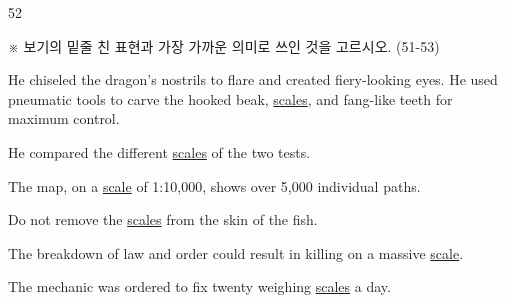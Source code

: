 \begin{question}{52}
\begin{framedtext}
※ 보기의 밑줄 친 표현과 가장 가까운 의미로 쓰인 것을 고르시오. (51-53) \par
\end{framedtext}
He chiseled the dragon's nostrils to flare and created fiery-looking eyes. He used pneumatic tools to carve the hooked beak, \uline{scales}, and fang-like teeth for maximum control.
\begin{choices}
  \item He compared the different \uline{scales} of the two tests.
  \item The map, on a \uline{scale} of 1:10,000, shows over 5,000 individual paths.
  \item Do not remove the \uline{scales} from the skin of the fish.
  \item The breakdown of law and order could result in killing on a massive \uline{scale}.
  \item The mechanic was ordered to fix twenty weighing \uline{scales} a day.
\end{choices}
\end{question}

